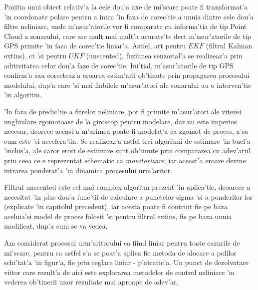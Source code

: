 \documentclass[12pt,a4paper,twoside]{report}
\begin{document}
\vspace{5px}

Pozitia unui obiect relativ'a la cele dou'a axe de mi'scare poate fi transformat'a 'in coordonate polare pentru a intra 'in faza de corec'tie a unuia dintre cele dou'a filtre neliniare, unde m'asur'atorile vor fi comparate cu informa'tia de tip Point Cloud a sonarului, care are mult mai mult'a acurate'te dec\ia t m'asur'atorile de tip GPS primite 'in faza de corec'tie liniar'a. Astfel, at\ia t pentru $EKF$ (filtrul Kalman extins), c\ia t 'si pentru $UKF$ (unscented), fuziunea senzorial'a se realizeaz'a prin aditivitatea celor dou'a faze de corec'tie. Ini'tial, m'asur'atorile de tip GPS confirm'a sau corecteaz'a eroarea estim'arii ob'tinute prin propagarea procesului modelului, dup'a care 'si mai fiabilele m'asur'atori ale sonarului au o interven'tie 'in algoritm. 

\vspace{5px}

'In faza de predic'tie a fitrelor neliniare, pot fi primite m'asur'atori ale vitezei unghiulare zgomotoase de la giroscop pentru modelare, dar nu este imperios necesar, deorece aceast'a m'arimea poate fi modelat'a ca zgomot de proces, a'sa cum este 'si accelera'tia. Se realizeaz'a astfel trei algoritmi de estimare 'in bucl'a 'inchis'a, ale caror erori de estimare sunt ob'tinute prin compararea cu adev'arul prin ceea ce e reprezentat schematic ca \textit{monitorizare}, iar aceast'a eroare devine intrarea ponderat'a 'in dinamica procesului urm'aritor.

\vspace{5px}

Filtrul unscented este cel mai complex algoritm prezent 'in aplica'tie, deoarece a necesitat 'in plus dou'a func'tii de calculare a punctelor sigma 'si a ponderilor lor (explicate 'in capitolul precedent), iar acesta poate fi contruit fie pe baza aceluia'si model de proces folosit 'si pentru filtrul extins, fie pe baza unuia modificat, dup'a cum se va vedea.

\vspace{5px}

Am considerat procesul urm'aritorului ca fiind liniar pentru toate cazurile de mi'scare, pentru ca astfel s'a se poat'a aplica fie metoda de alocare a polilor schi'tat'a 'in figur'a, fie prin reglare liniar - p'atratic'a. Un punct de dezolvatare viitor care rezult'a de aici este explorarea metodelor de control neliniare 'in vederea ob'tinerii unor rezultate mai aproape de adev'ar. 
\end{document}
